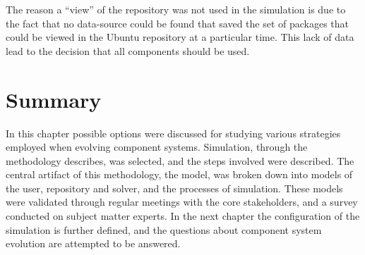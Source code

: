 The reason a ``view'' of the repository was not used in the simulation is due to the fact that no data-source could be found 
that saved the set of packages that could be viewed in the Ubuntu repository at a particular time.
This lack of data lead to the decision that all components should be used.

\section{Summary}
In this chapter possible options were discussed for studying various strategies employed when evolving component systems.
Simulation, through the methodology \citep{Law2005} describes, was selected, and the steps involved were described.
The central artifact of this methodology, the \usermodel model, was broken down into models of the user, repository and solver, and the processes of simulation.
These models were validated through regular meetings with the core stakeholders, and a survey conducted on subject matter experts.
In the next chapter the configuration of the simulation is further defined, and the questions about component system evolution are attempted to be answered.
